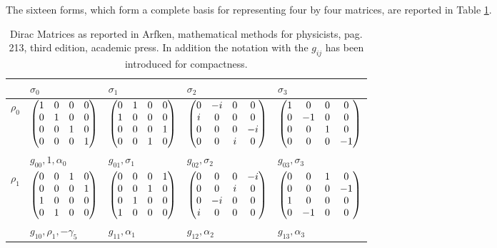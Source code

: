 \documentclass[handout,10pt]{beamer}
\begin{document}
\begin{frame}[shrink=20]{}
The sixteen forms, which form a complete basis for representing four by four matrices, are reported in Table \ref{Dirac_Matrices}.

\begin{table}[]
\centering
\caption{Dirac Matrices as reported in Arfken, mathematical methods for physicists, pag. 213, third edition, academic press. In addition the notation with the $g_{ij}$ has been introduced for compactness.}
\label{Dirac_Matrices}
\begin{tabular}{l l  l  l  l }
\hline
& $\sigma_0$ & $\sigma_1$  & $\sigma_2$ & $\sigma_3$ \\
\hline
$\rho_0$ & $\begin{pmatrix}1 & 0 & 0 & 0\cr 0 & 1 & 0 & 0\cr 0 & 0 & 1 & 0\cr 0 & 0 & 0 & 1\end{pmatrix}$  
& $\begin{pmatrix}0 & 1 & 0 & 0\cr 1 & 0 & 0 & 0\cr 0 & 0 & 0 & 1\cr 0 & 0 & 1 & 0\end{pmatrix}$ 
& $\begin{pmatrix}0 & -i & 0 & 0\cr i & 0 & 0 & 0\cr 0 & 0 & 0 & -i\cr 0 & 0 & i & 0\end{pmatrix}$ 
& $\begin{pmatrix}1 & 0 & 0 & 0\cr 0 & -1 & 0 & 0\cr 0 & 0 & 1 & 0\cr 0 & 0 & 0 & -1\end{pmatrix}$ \\
 & $g_{00}, 1, \alpha_0$ & $g_{01}, \sigma_1$  & $g_{02}, \sigma_2$ & $g_{03}, \sigma_3$ \\
\hline
$\rho_1$ &$\begin{pmatrix}0 & 0 & 1 & 0\cr 0 & 0 & 0 & 1\cr 1 & 0 & 0 & 0\cr 0 & 1 & 0 & 0\end{pmatrix}$  
& $\begin{pmatrix}0 & 0 & 0 & 1\cr 0 & 0 & 1 & 0\cr 0 & 1 & 0 & 0\cr 1 & 0 & 0 & 0\end{pmatrix}$ 
& $\begin{pmatrix}0 & 0 & 0 & -i\cr 0 & 0 & i & 0\cr 0 & -i & 0 & 0\cr i & 0 & 0 & 0\end{pmatrix}$ 
& $\begin{pmatrix}0 & 0 & 1 & 0\cr 0 & 0 & 0 & -1\cr 1 & 0 & 0 & 0\cr 0 & -1 & 0 & 0\end{pmatrix}$ \\
& $g_{10}, \rho_1, -\gamma_5$  & $g_{11}, \alpha_1$  & $g_{12},\alpha_2$ & $g_{13}, \alpha_3$ \\

\end{tabular}
\end{table}
\end{frame}
\end{document}
